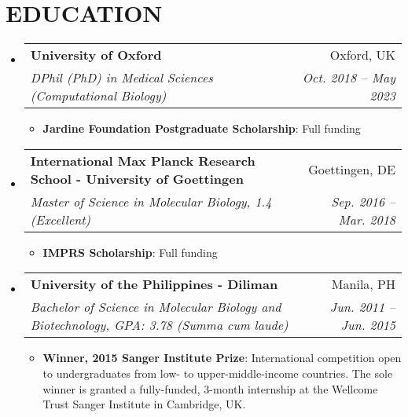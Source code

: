 \documentclass[legalpaper,11pt]{article}
\makeatletter
\newcommand{\resumeItem}[2]{
  \item\small{
    \textbf{#1}{: #2 \vspace{-2pt}}
  }
}
\newcommand{\resumeSubheading}[4]{
  \vspace{-1pt}\item
    \begin{tabular*}{0.97\textwidth}[t]{l@{\extracolsep{\fill}}r}
      \textbf{#1} & #2 \\
      \textit{\small#3} & \textit{\small #4} \\
    \end{tabular*}\vspace{-5pt}
}
\newcommand{\resumeSubHeadingListStart}{\begin{itemize}[leftmargin=*]}
\newcommand{\resumeSubHeadingListEnd}{\end{itemize}}
\newcommand{\resumeItemListStart}{\begin{itemize}}
\newcommand{\resumeItemListEnd}{\end{itemize}\vspace{-5pt}}
\makeatother
\begin{document}

\section{EDUCATION}
  \resumeSubHeadingListStart
    \resumeSubheading
      {University of Oxford}{Oxford, UK}
      {DPhil (PhD) in Medical Sciences (Computational Biology)}{Oct. 2018 -- May 2023}
      \resumeItemListStart
        \resumeItem{Jardine Foundation Postgraduate Scholarship}
        {Full funding}
      \resumeItemListEnd
    \resumeSubheading
      {International Max Planck Research School - University of Goettingen}{Goettingen, DE}
      {Master of Science in Molecular Biology,  1.4 (Excellent)}{Sep. 2016 -- Mar. 2018}
      \resumeItemListStart
        \resumeItem{IMPRS Scholarship}
          {Full funding}
      \resumeItemListEnd
      \resumeSubheading
      {University of the Philippines - Diliman}{Manila, PH}
      {Bachelor of Science in Molecular Biology and Biotechnology, GPA: 3.78 (\textit{Summa cum laude})}{Jun. 2011 -- Jun. 2015}
       \resumeItemListStart
          \resumeItem{Winner, 2015 Sanger Institute Prize}
          
          {International competition open to undergraduates from low- to upper-middle-income countries. The sole winner is granted a fully-funded, 3-month internship at the Wellcome Trust Sanger Institute in Cambridge, UK.}
      \resumeItemListEnd
  \resumeSubHeadingListEnd
  
  
\end{document}
